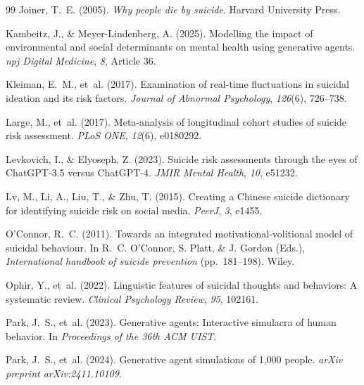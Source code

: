 \documentclass[review,12pt,authoryear]{elsarticle}
\begin{document}
\begin{thebibliography}{99}
Joiner, T.~E. (2005).
\newblock \textit{Why people die by suicide}.
\newblock Harvard University Press.

Kambeitz, J., \& Meyer-Lindenberg, A. (2025).
\newblock Modelling the impact of environmental and social determinants on mental health using generative agents.
\newblock \textit{npj Digital Medicine}, \textit{8}, Article 36.

Kleiman, E.~M., et~al. (2017).
\newblock Examination of real-time fluctuations in suicidal ideation and its risk factors.
\newblock \textit{Journal of Abnormal Psychology}, \textit{126}(6), 726--738.

Large, M., et~al. (2017).
\newblock Meta-analysis of longitudinal cohort studies of suicide risk assessment.
\newblock \textit{PLoS ONE}, \textit{12}(6), e0180292.

Levkovich, I., \& Elyoseph, Z. (2023).
\newblock Suicide risk assessments through the eyes of {ChatGPT}-3.5 versus {ChatGPT}-4.
\newblock \textit{JMIR Mental Health}, \textit{10}, e51232.

Lv, M., Li, A., Liu, T., \& Zhu, T. (2015).
\newblock Creating a {C}hinese suicide dictionary for identifying suicide risk on social media.
\newblock \textit{PeerJ}, \textit{3}, e1455.

O'Connor, R.~C. (2011).
\newblock Towards an integrated motivational-volitional model of suicidal behaviour.
\newblock In R.~C. O'Connor, S. Platt, \& J. Gordon (Eds.), \textit{International handbook of suicide prevention} (pp.\ 181--198). Wiley.

Ophir, Y., et~al. (2022).
\newblock Linguistic features of suicidal thoughts and behaviors: {A} systematic review.
\newblock \textit{Clinical Psychology Review}, \textit{95}, 102161.

Park, J.~S., et~al. (2023).
\newblock Generative agents: {I}nteractive simulacra of human behavior.
\newblock In \textit{Proceedings of the 36th ACM UIST}.

Park, J.~S., et~al. (2024).
\newblock Generative agent simulations of 1,000 people.
\newblock \textit{arXiv preprint arXiv:2411.10109}.


\end{thebibliography}
\end{document}
